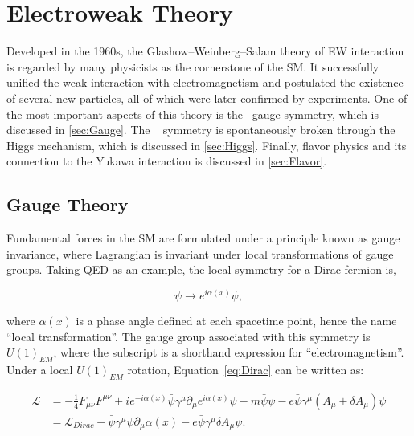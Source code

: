 \chapter{Electroweak Theory}
\label{chap:SM}

Developed in the 1960s, the Glashow–Weinberg–Salam theory of \ac{EW} interaction is regarded by many physicists as the cornerstone of the \ac{SM}. It successfully unified the weak interaction with electromagnetism and postulated the existence of several new particles, all of which were later confirmed by experiments. One of the most important aspects of this theory is the \ew~gauge symmetry, which is discussed in \autoref{sec:Gauge}. The \ew~ symmetry is spontaneously broken through the Higgs mechanism, which is discussed in \autoref{sec:Higgs}. Finally, flavor physics and its connection to the Yukawa interaction is discussed in \autoref{sec:Flavor}. 

\section{Gauge Theory}
\label{sec:Gauge}

Fundamental forces in the \ac{SM} are formulated under a principle known as gauge invariance, where Lagrangian is invariant under local transformations of gauge groups. Taking \ac{QED} as an example, the local symmetry for a Dirac fermion is,

\begin{equation}
\psi\rightarrow e^{i\alpha(x)}\psi,
\end{equation}

where $\alpha(x)$ is a phase angle defined at each spacetime point, hence the name ``local transformation''. The gauge group associated with this symmetry is $U(1)_{EM}$, where the subscript is a shorthand expression for ``electromagnetism''. Under a local $U(1)_{EM}$ rotation, Equation~\ref{eq:Dirac} can be written as:

\begin{equation}
\begin{split}
\label{eq:QEDGauge}
\mathcal{L}&=-\frac{1}{4}F_{\mu\nu}F^{\mu\nu}+ie^{-i\alpha(x)}\bar{\psi}\gamma^{\mu}\partial_{\mu}e^{i\alpha(x)}\psi-m\bar{\psi}\psi-e\bar{\psi}\gamma^{\mu}(A_{\mu}+\delta A_{\mu})\psi\\
&=\mathcal{L}_{Dirac}-\bar{\psi}\gamma^{\mu}\psi\partial_{\mu}\alpha(x)-e\bar{\psi}\gamma^{\mu}\delta A_{\mu}\psi.
\end{split}
\end{equation}

